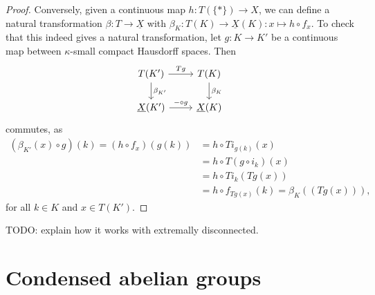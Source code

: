 \documentclass{article}
\begin{document}
\begin{proof}
    Conversely, given a continuous map $h\colon T(\{*\}) \to X$,
    we can define a natural transformation
    $\beta \colon T \to \underline{X}$
    with $\beta_K \colon T(K) \to \underline{X}(K)\colon x \mapsto h\circ f_x$.
    To check that this indeed gives a natural transformation, let
    $g\colon K \to K'$ be a continuous map between $\kappa$-small
    compact Hausdorff spaces. Then
    \begin{equation*}
        \begin{tikzcd}
            T(K') \rar["Tg"] \dar["\beta_{K'}"] & T(K) \dar["\beta_K"] \\
            \underline{X}(K') \rar["-\circ g"] & \underline{X}(K)
        \end{tikzcd}
    \end{equation*}
    commutes, as
    \begin{align*}
        (\beta_{K'}(x)\circ g)(k)
        = (h\circ f_x)(g(k))
         & = h\circ Ti_{g(k)}(x)     \\
         & = h\circ T(g\circ i_k)(x) \\
         & = h\circ Ti_k (Tg(x))     \\
         & = h\circ f_{Tg(x)}(k)
        = \beta_K((Tg(x))),
    \end{align*}
    for all $k\in K$ and $x\in T(K')$.
\end{proof}

TODO: explain how it works with extremally disconnected.
\section{Condensed abelian groups}


\end{document}
